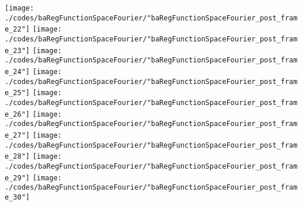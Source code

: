 \begin{frame}{\insertsection}
\begin{center}
{\begin{animateinline}{15}
				 \texttt{[image: ./codes/baRegFunctionSpaceFourier/"baRegFunctionSpaceFourier\_post\_frame\_22"]}\newframe
				 \texttt{[image: ./codes/baRegFunctionSpaceFourier/"baRegFunctionSpaceFourier\_post\_frame\_23"]}\newframe
				 \texttt{[image: ./codes/baRegFunctionSpaceFourier/"baRegFunctionSpaceFourier\_post\_frame\_24"]}\newframe
				 \texttt{[image: ./codes/baRegFunctionSpaceFourier/"baRegFunctionSpaceFourier\_post\_frame\_25"]}\newframe
				 \texttt{[image: ./codes/baRegFunctionSpaceFourier/"baRegFunctionSpaceFourier\_post\_frame\_26"]}\newframe
				 \texttt{[image: ./codes/baRegFunctionSpaceFourier/"baRegFunctionSpaceFourier\_post\_frame\_27"]}\newframe
				 \texttt{[image: ./codes/baRegFunctionSpaceFourier/"baRegFunctionSpaceFourier\_post\_frame\_28"]}\newframe
				 \texttt{[image: ./codes/baRegFunctionSpaceFourier/"baRegFunctionSpaceFourier\_post\_frame\_29"]}\newframe
				 \texttt{[image: ./codes/baRegFunctionSpaceFourier/"baRegFunctionSpaceFourier\_post\_frame\_30"]}
			 \end{animateinline}
			}
	\end{center}
    
\end{frame}


